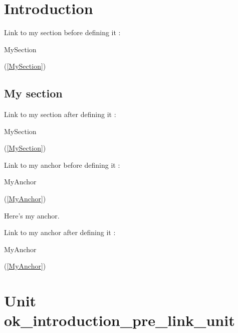\documentclass{report}
\begin{document}
\label{toc}\tableofcontents
\newpage
\newlength{\tmplength}
\chapter{Introduction}
\label{ok_introduction_pre_link}
Link to my section before defining it : \begin{ttfamily}MySection\end{ttfamily}(\ref{MySection})

\label{MySection}
\section{My section}


Link to my section after defining it : \begin{ttfamily}MySection\end{ttfamily}(\ref{MySection})

Link to my anchor before defining it : \begin{ttfamily}MyAnchor\end{ttfamily}(\ref{MyAnchor})

\label{MyAnchor}
 Here's my anchor.

Link to my anchor after defining it : \begin{ttfamily}MyAnchor\end{ttfamily}(\ref{MyAnchor})\chapter{Unit ok{\_}introduction{\_}pre{\_}link{\_}unit}
\label{ok_introduction_pre_link_unit}
\end{document}
